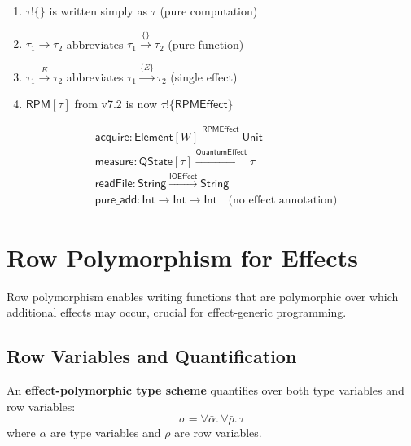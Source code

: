 \begin{notation}
\label{not:effect-conventions}
\begin{enumerate}
  \item $\tau \mathbin{!} \{\}$ is written simply as $\tau$ (pure computation)
  \item $\tau_1 \to \tau_2$ abbreviates $\tau_1 \xrightarrow{\{\}} \tau_2$ (pure function)
  \item $\tau_1 \xrightarrow{E} \tau_2$ abbreviates $\tau_1 \xrightarrow{\{E\}} \tau_2$ (single effect)
  \item $\mathsf{RPM}[\tau]$ from v7.2 is now $\tau \mathbin{!} \{\mathsf{RPMEffect}\}$
\end{enumerate}
\end{notation}

\begin{example}
\label{ex:effect-types}
\begin{align}
&\mathsf{acquire} : \mathsf{Element}[W] \xrightarrow{\mathsf{RPMEffect}} \mathsf{Unit} \\
&\mathsf{measure} : \mathsf{QState}[\tau] \xrightarrow{\mathsf{QuantumEffect}} \tau \\
&\mathsf{readFile} : \mathsf{String} \xrightarrow{\mathsf{IOEffect}} \mathsf{String} \\
&\mathsf{pure\_add} : \mathsf{Int} \to \mathsf{Int} \to \mathsf{Int} \quad \text{(no effect annotation)}
\end{align}
\end{example}

\section{Row Polymorphism for Effects}
\label{sec:row-polymorphism}

Row polymorphism enables writing functions that are polymorphic over which additional effects may occur, crucial for effect-generic programming.

\subsection{Row Variables and Quantification}
\label{subsec:row-vars}

\begin{definition}
\label{def:effect-poly-scheme}
An \textbf{effect-polymorphic type scheme} quantifies over both type variables and row variables:
\[
\sigma = \forall \bar{\alpha}.\, \forall \bar{\rho}.\, \tau
\]
where $\bar{\alpha}$ are type variables and $\bar{\rho}$ are row variables.
\end{definition}


